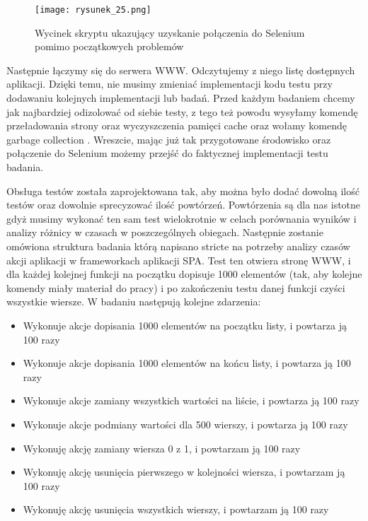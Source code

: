 \begin{figure}[htbp]
    \centering
    \texttt{[image: rysunek\_25.png]}
    \caption{Wycinek skryptu ukazujący uzyskanie połączenia do Selenium pomimo początkowych problemów}
    \label{fig:rysunek_25}
\end{figure}

Następnie łączymy się do serwera WWW. Odczytujemy z niego listę dostępnych aplikacji.
Dzięki temu, nie musimy zmieniać implementacji kodu testu przy dodawaniu kolejnych implementacji lub badań.
Przed każdym badaniem chcemy jak najbardziej odizolować od siebie testy, z tego też powodu wysyłamy komendę przeładowania strony oraz wyczyszczenia pamięci cache
oraz wołamy komendę garbage collection \cite{mozilla-memory}.
Wreszcie, mając już tak przygotowane środowisko oraz połączenie do Selenium możemy przejść do faktycznej implementacji testu badania.

Obsługa testów została zaprojektowana tak, aby można było dodać dowolną ilość testów oraz dowolnie sprecyzować ilość powtórzeń.
Powtórzenia są dla nas istotne gdyż musimy wykonać ten sam test wielokrotnie w celach porównania wyników i analizy różnicy w czasach w poszczególnych obiegach.
Następnie zostanie omówiona struktura badania którą napisano stricte na potrzeby analizy czasów akcji aplikacji w frameworkach aplikacji SPA.
Test ten otwiera stronę WWW, i dla każdej kolejnej funkcji na początku dopisuje 1000 elementów (tak, aby kolejne komendy miały materiał do pracy)
i po zakończeniu testu danej funkcji czyści wszystkie wiersze. W badaniu następują kolejne zdarzenia:

\begin{itemize}
    \item Wykonuje akcje dopisania 1000 elementów na początku listy, i powtarza ją 100 razy
    \item Wykonuje akcje dopisania 1000 elementów na końcu listy, i powtarza ją 100 razy
    \item Wykonuje akcje zamiany wszystkich wartości na liście, i powtarza ją 100 razy
    \item Wykonuje akcje podmiany wartości dla 500 wierszy, i powtarza ją 100 razy
    \item Wykonuję akcję zamiany wiersza 0 z 1, i powtarzam ją 100 razy
    \item Wykonuję akcję usunięcia pierwszego w kolejności wiersza, i powtarzam ją 100 razy
    \item Wykonuję akcję usunięcia wszystkich wierszy, i powtarzam ją 100 razy
\end{itemize}


